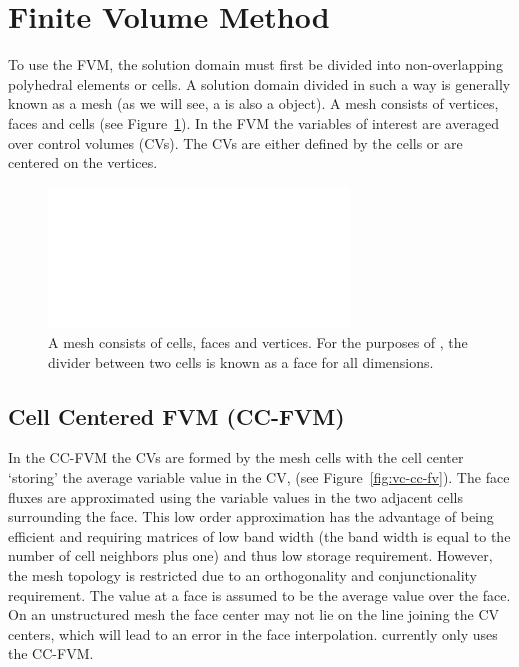 \section{Finite Volume Method}

To use the FVM, the solution domain must first be divided into
non-overlapping polyhedral elements or cells.  A solution domain
divided in such a way is generally known as a mesh (as we will see, a
 is also a \FiPy{} object).  A mesh consists of vertices,
faces and cells (see Figure~\ref{fig:meshcartoon}).  In the FVM the
variables of interest are averaged over control volumes (CVs).  The
CVs are either defined by the cells or are centered on the vertices.

\begin{figure}
 \begin{center}
 \includegraphics[width=8cm]{numerical/meshcartoon.pdf}
 \caption{A mesh consists of cells, faces and vertices. For the
 purposes of \FiPy{}, the divider between two cells is known as a face
 for all dimensions.}  \label{fig:meshcartoon} \end{center}
\end{figure}

\subsection{Cell Centered FVM (CC-FVM)}

In the CC-FVM the CVs are formed by the mesh cells with the cell
center `storing' the average variable value in the CV, (see
Figure~\ref{fig:vc-cc-fv}). The face fluxes are approximated using the
variable values in the two adjacent cells surrounding the face. This
low order approximation has the advantage of being efficient and
requiring matrices of low band width (the band width is equal to the
number of cell neighbors plus one) and thus low storage
requirement. However, the mesh topology is restricted due to an
orthogonality and conjunctionality requirement. The value at a face is
assumed to be the average value over the face. On an unstructured mesh
the face center may not lie on the line joining the CV centers, which
will lead to an error in the face interpolation. \FiPy{} currently
only uses the CC-FVM.

